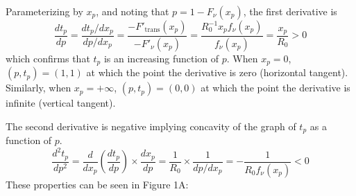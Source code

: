 \documentclass[
]{article}
\begin{document}
Parameterizing by \(x_p\), and noting that \(p=1-F_\nu(x_p)\), the first
derivative is \[ \frac{d t_p}{dp} = \frac{dt_p/dx_p}{dp/dx_p} 
= \frac{-F'_\mathrm{trans}(x_p)}{-F'_\nu(x_p)} = 
\frac{R_0^{-1} x_p f_\nu(x_p)}{f_\nu(x_p)} = \frac{x_p}{R_0} > 0\] which
confirms that \(t_p\) is an increasing function of \(p\). When
\(x_p=0\), \((p, t_p) = (1,1)\) at which the point the derivative is
zero (horizontal tangent). Similarly, when \(x_p=+\infty\),
\((p, t_p) = (0,0)\) at which the point the derivative is infinite
(vertical tangent).

The second derivative is negative implying concavity of the graph of
\(t_p\) as a function of \(p\). \[ \frac{d^2 t_p}{dp^2} 
= \frac{d}{dx_p} \left(\frac{d t_p}{dp}\right) \times \frac{d x_p}{dp} 
= \frac{1}{R_0} \times \frac{1}{dp/dx_p} = - \frac{1}{R_0 f_\nu(x_p)} <0\]
These properties can be seen in Figure 1A:
\end{document}
